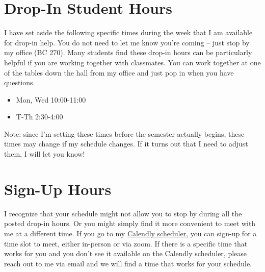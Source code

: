 \documentclass[
  letterpaper,
  DIV=11,
  numbers=noendperiod]{scrreprt}
\providecommand{\tightlist}{%
  \setlength{\itemsep}{0pt}\setlength{\parskip}{0pt}}\usepackage{longtable,booktabs,array}
\begin{document}
\section{Drop-In Student Hours}\label{drop-in-student-hours}

I have set aside the following specific times during the week that I am
available for drop-in help. You do not need to let me know you're coming
-- just stop by my office (BC 270). Many students find these drop-in
hours can be particularly helpful if you are working together with
classmates. You can work together at one of the tables down the hall
from my office and just pop in when you have questions.

\begin{itemize}
\tightlist
\item
  Mon, Wed 10:00-11:00
\item
  T-Th 2:30-4:00
\end{itemize}

\begin{tcolorbox}[enhanced jigsaw, breakable, rightrule=.15mm, left=2mm, arc=.35mm, bottomrule=.15mm, colframe=quarto-callout-note-color-frame, toprule=.15mm, leftrule=.75mm, opacityback=0, colback=white]
\begin{minipage}[t]{5.5mm}
\textcolor{quarto-callout-note-color}{\faInfo}
\end{minipage}%
\begin{minipage}[t]{\textwidth - 5.5mm}

Note: since I'm setting these times before the semester actually begins,
these times may change if my schedule changes. If it turns out that I
need to adjust them, I will let you know!

\end{minipage}%
\end{tcolorbox}

\section{Sign-Up Hours}\label{sign-up-hours}

I recognize that your schedule might not allow you to stop by during all
the posted drop-in hours. Or you might simply find it more convenient to
meet with me at a different time. If you go to my
\href{https://calendly.com/hallstro}{Calendly scheduler}, you can
sign-up for a time slot to meet, either in-person or via zoom. If there
is a specific time that works for you and you don't see it available on
the Calendly scheduler, please reach out to me via email and we will
find a time that works for your schedule.
\end{document}
